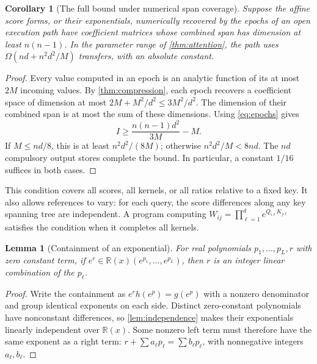 \documentclass[11pt]{article}
\newtheorem{lemma}[lemma]{Lemma}
\newtheorem{corollary}[corollary]{Corollary}
\theoremstyle{definition}
\theoremstyle{remark}
\newcommand{\R}{\mathbb R}
\begin{document}
\begin{corollary}[The full bound under numerical span coverage]
\label{cor:pair-cover}
Suppose the affine score forms, or their exponentials, numerically
recovered by the epochs of an open execution path have coefficient
matrices whose combined span has dimension at least $n(n-1)$.
In the parameter range of \cref{thm:attention}, the path uses
$\Omega(nd+n^2d^2/M)$ transfers, with an absolute constant.
\end{corollary}
\begin{proof}
Every value computed in an epoch is an analytic function of its at
most $2M$ incoming values. By \cref{thm:compression}, each epoch
recovers a coefficient space of dimension at most
$2M+M^2/d^2\le3M^2/d^2$. The dimension of their combined span is
at most the sum of these dimensions. Using \cref{eq:epochs} gives
\begin{equation}
 I\ge\frac{n(n-1)d^2}{3M}-M.
 \label{eq:span-io}
\end{equation}
If $M\le nd/8$, this is at least $n^2d^2/(8M)$; otherwise
$n^2d^2/M<8nd$. The $nd$ compulsory output stores complete the bound.
In particular, a constant $1/16$ suffices in both cases.
\end{proof}

This condition covers all scores, all kernels, or all ratios relative
to a fixed key. It also allows references to vary: for each query,
the score differences along any key spanning tree are independent.
A program computing $W_{ij}=\prod_{\ell=1}^d e^{Q_{i\ell}K_{j\ell}}$
satisfies the condition when it completes all kernels.

\begin{lemma}[Containment of an exponential]
\label{lem:character}
For real polynomials $p_1,\ldots,p_L,r$ with zero constant term, if
$e^r\in\R(x)(e^{p_1},\ldots,e^{p_L})$, then $r$ is an integer
linear combination of the $p_\ell$.
\end{lemma}
\begin{proof}
Write the containment as $e^r h(e^p)=g(e^p)$ with a nonzero denominator
and group identical exponents on each side. Distinct zero-constant
polynomials have nonconstant differences, so \cref{lem:independence}
makes their exponentials linearly independent over $\R(x)$. Some
nonzero left term must therefore have the same exponent as a right term:
$r+\sum a_\ell p_\ell=\sum b_\ell p_\ell$, with nonnegative integers
$a_\ell,b_\ell$.
\end{proof}
\end{document}
